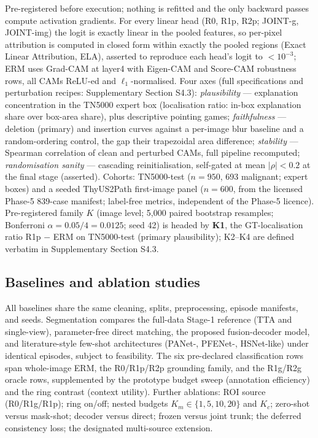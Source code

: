 \documentclass[jimh,article,submit,moreauthors,pdftex]{Definitions/tsp}
\begin{document}
Pre-registered before execution; nothing is refitted and the only
backward passes compute activation gradients. For every linear head
(R0, R1p, R2p; JOINT-g, JOINT-img) the logit is exactly linear in the
pooled features, so per-pixel attribution is computed in closed form
within exactly the pooled regions (Exact Linear Attribution, ELA),
asserted to reproduce each head's logit to $<10^{-3}$; ERM uses
Grad-CAM at layer4 with Eigen-CAM and Score-CAM robustness rows, all
CAMs ReLU-ed and $\ell_1$-normalised. Four axes (full specifications
and perturbation recipes: Supplementary Section S4.3):
\emph{plausibility} --- explanation concentration in the TN5000 expert
box (localisation ratio: in-box explanation share over box-area share),
plus descriptive pointing games; \emph{faithfulness} --- deletion
(primary) and insertion curves against a per-image blur baseline and a
random-ordering control, the gap their trapezoidal area difference;
\emph{stability} --- Spearman correlation of clean and perturbed CAMs,
full pipeline recomputed; \emph{randomisation sanity} --- cascading
reinitialisation, self-gated at mean $\lvert\rho\rvert < 0.2$ at the
final stage (asserted). Cohorts: TN5000-test ($n{=}950$, 693 malignant;
expert boxes) and a seeded ThyUS2Path first-image panel ($n{=}600$,
from the licensed Phase-5 839-case manifest; label-free metrics,
independent of the Phase-5 licence). Pre-registered family $K$ (image
level; 5{,}000 paired bootstrap resamples; Bonferroni
$\alpha = 0.05/4 = 0.0125$; seed 42) is headed by \textbf{K1}, the
GT-localisation ratio R1p $-$ ERM on TN5000-test (primary
plausibility); K2--K4 are defined verbatim in Supplementary Section
S4.3.

\subsection{Baselines and ablation studies}
\label{subsec:baselines}

All baselines share the same cleaning, splits, preprocessing, episode
manifests, and seeds. Segmentation compares the full-data Stage-1
reference (TTA and single-view), parameter-free direct matching, the
proposed fusion-decoder model, and literature-style few-shot
architectures (PANet-, PFENet-, HSNet-like) under identical episodes,
subject to feasibility. The six pre-declared classification rows span
whole-image ERM, the R0/R1p/R2p grounding family, and the R1g/R2g
oracle rows, supplemented by the prototype budget sweep (annotation
efficiency) and the ring contrast (context utility). Further ablations:
ROI source (R0/R1g/R1p); ring on/off; nested budgets
$K_m\in\{1,5,10,20\}$ and $K_c$; zero-shot versus mask-shot; decoder
versus direct; frozen versus joint trunk; the deferred consistency
loss; the designated multi-source extension.
\end{document}

